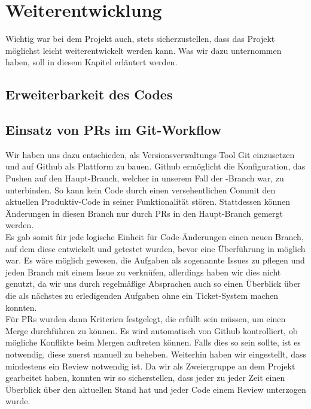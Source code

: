 \chapter{Weiterentwicklung}
\label{ch:weiterentwicklung}

Wichtig war bei dem Projekt auch, stets sicherzustellen, dass das Projekt möglichst leicht weiterentwickelt werden kann.
Was wir dazu unternommen haben, soll in diesem Kapitel erläutert werden.

\section{Erweiterbarkeit des Codes}
\label{sec:erweiterbarkeit}


\section{Einsatz von PRs im Git-Workflow}
\label{sec:git-workflow}

Wir haben uns dazu entschieden, als Versionsverwaltungs-Tool Git einzusetzen und auf Github als Plattform zu bauen.
Github ermöglicht die Konfiguration, das Pushen auf den Haupt-Branch, welcher in unserem Fall der -Branch war,
zu unterbinden.
So kann kein Code durch einen versehentlichen Commit den aktuellen Produktiv-Code in seiner Funktionalität stören.
Stattdessen können Änderungen in diesen Branch nur durch \ac{PR}s in den Haupt-Branch gemergt werden. \\

Es gab somit für jede logische Einheit für Code-Änderungen einen neuen Branch, auf dem diese entwickelt und getestet
wurden, bevor eine Überführung in  möglich war.
Es wäre möglich gewesen, die Aufgaben als sogenannte Issues zu pflegen und jeden Branch mit einem Issue zu verknüfen,
allerdings haben wir dies nicht genutzt, da wir uns durch regelmäßige Absprachen auch so einen Überblick über die
als nächstes zu erledigenden Aufgaben ohne ein Ticket-System machen konnten. \\

Für \ac{PR}s wurden dann Kriterien festgelegt, die erfüllt sein müssen, um einen Merge durchführen zu können.
Es wird automatisch von Github kontrolliert, ob mögliche Konflikte beim Mergen auftreten können.
Falls dies so sein sollte, ist es notwendig, diese zuerst manuell zu beheben.
Weiterhin haben wir eingestellt, dass mindestens ein Review notwendig ist.
Da wir als Zweiergruppe an dem Projekt gearbeitet haben, konnten wir so sicherstellen, dass jeder zu jeder Zeit einen
Überblick über den aktuellen Stand hat und jeder Code einem Review unterzogen wurde.

